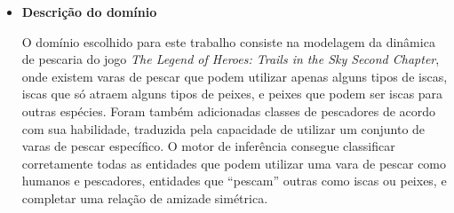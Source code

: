 \documentclass{../../sftex/sftex}
\begin{document}
\begin{itemize}
    \item \textbf{Descrição do domínio}

        O domínio escolhido para este trabalho consiste na modelagem da
        dinâmica de pescaria do jogo \emph{The Legend of Heroes: Trails in the
        Sky Second Chapter}, onde existem varas de pescar que podem utilizar
        apenas alguns tipos de iscas, iscas que só atraem alguns tipos de
        peixes, e peixes que podem ser iscas para outras espécies. Foram
        também adicionadas classes de pescadores de acordo com sua habilidade,
        traduzida pela capacidade de utilizar um conjunto de varas de pescar
        específico. O motor de inferência consegue classificar corretamente
        todas as entidades que podem utilizar uma vara de pescar como humanos
        e pescadores, entidades que ``pescam'' outras como iscas ou peixes,
        e completar uma relação de amizade simétrica.

\end{itemize}


\end{document}
